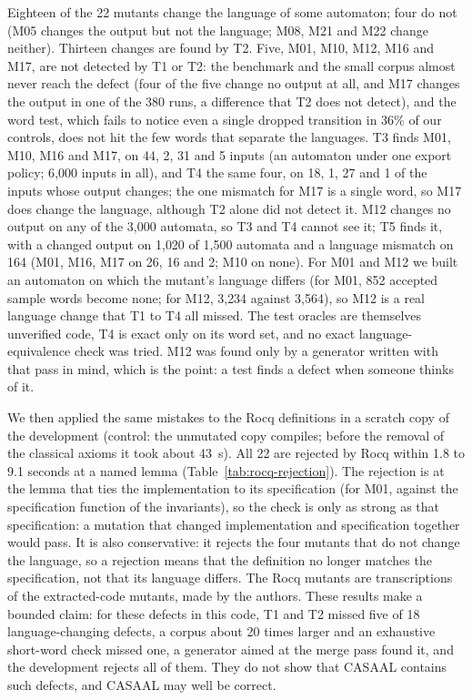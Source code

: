 Eighteen of the 22 mutants change the language of some automaton; four do not (M05 changes the output but not the language; M08, M21 and M22 change neither). Thirteen changes are found by T2. Five, M01, M10, M12, M16 and M17, are not detected by T1 or T2: the benchmark and the small corpus almost never reach the defect (four of the five change no output at all, and M17 changes the output in one of the 380 runs, a difference that T2 does not detect), and the word test, which fails to notice even a single dropped transition in 36\% of our controls, does not hit the few words that separate the languages. T3 finds M01, M10, M16 and M17, on 44, 2, 31 and 5 inputs (an automaton under one export policy; 6{,}000 inputs in all), and T4 the same four, on 18, 1, 27 and 1 of the inputs whose output changes; the one mismatch for M17 is a single word, so M17 does change the language, although T2 alone did not detect it. M12 changes no output on any of the 3{,}000 automata, so T3 and T4 cannot see it; T5 finds it, with a changed output on 1{,}020 of 1{,}500 automata and a language mismatch on 164 (M01, M16, M17 on 26, 16 and 2; M10 on none). For M01 and M12 we built an automaton on which the mutant's language differs (for M01, 852 accepted sample words become none; for M12, 3{,}234 against 3{,}564), so M12 is a real language change that T1 to T4 all missed. The test oracles are themselves unverified code, T4 is exact only on its word set, and no exact language-equivalence check was tried. M12 was found only by a generator written with that pass in mind, which is the point: a test finds a defect when someone thinks of it.

We then applied the same mistakes to the Rocq definitions in a scratch copy of the development (control: the unmutated copy compiles; before the removal of the classical axioms it took about 43~s). All 22 are rejected by Rocq within 1.8 to 9.1 seconds at a named lemma (Table~\ref{tab:rocq-rejection}). The rejection is at the lemma that ties the implementation to its specification (for M01, against the specification function of the invariants), so the check is only as strong as that specification: a mutation that changed implementation and specification together would pass. It is also conservative: it rejects the four mutants that do not change the language, so a rejection means that the definition no longer matches the specification, not that its language differs. The Rocq mutants are transcriptions of the extracted-code mutants, made by the authors. These results make a bounded claim: for these defects in this code, T1 and T2 missed five of 18 language-changing defects, a corpus about 20 times larger and an exhaustive short-word check missed one, a generator aimed at the merge pass found it, and the development rejects all of them. They do not show that CASAAL contains such defects, and CASAAL may well be correct.


